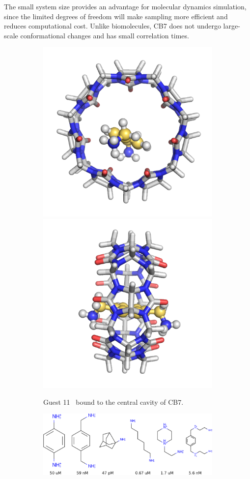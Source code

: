 \documentclass[10pt,final]{article}
\begin{document}
The small system size provides an advantage for molecular dynamics simulation, since the limited degrees of freedom will make sampling more efficient and reduces computational cost.
%
Unlike biomolecules, CB7 does not undergo large-scale conformational changes and has small correlation times.

\begin{figure}[H]
\centering
\begin{subfigure}{.5\textwidth}
  \centering
  \includegraphics[width=.4\linewidth]{figures/guest11_top.png}
  \includegraphics[width=.4\linewidth]{figures/guest11_side.png}
  \caption{Guest 11~\autocite{Cao2013a} bound to the central cavity of CB7.}
  \label{fig:sub1}
\end{subfigure}%
\begin{subfigure}{.5\textwidth}
  \centering
  \includegraphics[width=0.95\linewidth]{figures/Kd_guest.png}  

\end{subfigure}
\end{figure}
\end{document}
